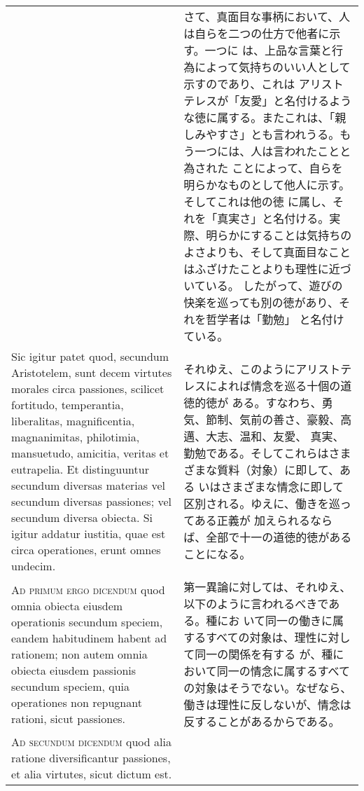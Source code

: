 \documentclass[10pt]{jsarticle}
\begin{document}
\begin{longtable}{p{21em}p{21em}}
&

 さて、真面目な事柄において、人は自らを二つの仕方で他者に示す。一つに
 は、上品な言葉と行為によって気持ちのいい人として示すのであり、これは
 アリストテレスが「友愛」と名付けるような徳に属する。またこれは、「親
 しみやすさ」とも言われうる。もう一つには、人は言われたことと為された
 ことによって、自らを明らかなものとして他人に示す。そしてこれは他の徳
 に属し、それを「真実さ」と名付ける。実際、明らかにすることは気持ちの
 よさよりも、そして真面目なことはふざけたことよりも理性に近づいている。
 したがって、遊びの快楽を巡っても別の徳があり、それを哲学者は「勤勉」
 と名付けている。

 
\\



 Sic igitur patet quod, secundum Aristotelem, sunt decem virtutes
 morales circa passiones, scilicet fortitudo, temperantia,
 liberalitas, magnificentia, magnanimitas, philotimia, mansuetudo,
 amicitia, veritas et eutrapelia. Et distinguuntur secundum diversas
 materias vel secundum diversas passiones; vel secundum diversa
 obiecta. Si igitur addatur iustitia, quae est circa operationes,
 erunt omnes undecim.

 
&

 それゆえ、このようにアリストテレスによれば情念を巡る十個の道徳的徳が
 ある。すなわち、勇気、節制、気前の善さ、豪毅、高邁、大志、温和、友愛、
 真実、勤勉である。そしてこれらはさまざまな質料（対象）に即して、ある
 いはさまざまな情念に即して区別される。ゆえに、働きを巡ってある正義が
 加えられるならば、全部で十一の道徳的徳があることになる。

 
 
\\



 {\scshape Ad primum ergo dicendum} quod omnia obiecta eiusdem
 operationis secundum speciem, eandem habitudinem habent ad rationem;
 non autem omnia obiecta eiusdem passionis secundum speciem, quia
 operationes non repugnant rationi, sicut passiones.
 
&

 第一異論に対しては、それゆえ、以下のように言われるべきである。種にお
 いて同一の働きに属するすべての対象は、理性に対して同一の関係を有する
 が、種において同一の情念に属するすべての対象はそうでない。なぜなら、
 働きは理性に反しないが、情念は反することがあるからである。
 
\\

 {\scshape Ad secundum dicendum} quod alia ratione diversificantur
 passiones, et alia virtutes, sicut dictum est.
 

\end{longtable}
\end{document}
